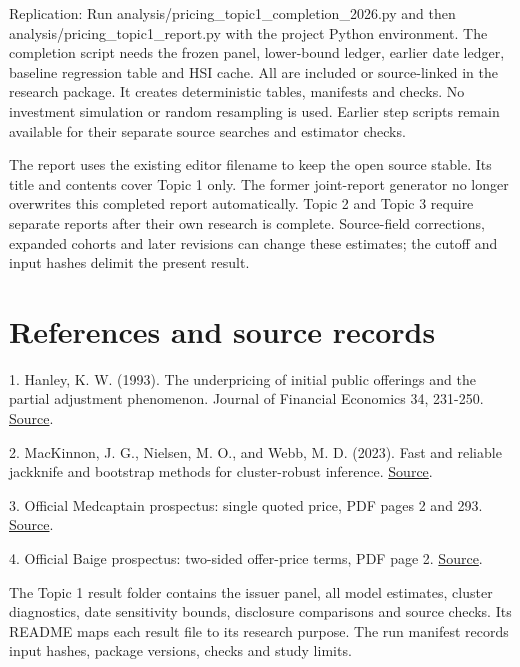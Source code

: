 \documentclass[10pt,a4paper]{article}
\begin{document}
Replication: Run analysis/pricing\_topic1\_completion\_2026.py and then analysis/pricing\_topic1\_report.py with the project Python environment. The completion script needs the frozen panel, lower-bound ledger, earlier date ledger, baseline regression table and HSI cache. All are included or source-linked in the research package. It creates deterministic tables, manifests and checks. No investment simulation or random resampling is used. Earlier step scripts remain available for their separate source searches and estimator checks.

The report uses the existing editor filename to keep the open source stable. Its title and contents cover Topic 1 only. The former joint-report generator no longer overwrites this completed report automatically. Topic 2 and Topic 3 require separate reports after their own research is complete. Source-field corrections, expanded cohorts and later revisions can change these estimates; the cutoff and input hashes delimit the present result.

\section*{References and source records}

{\footnotesize 1. Hanley, K. W. (1993). The underpricing of initial public offerings and the partial adjustment phenomenon. Journal of Financial Economics 34, 231-250. \href{https://business.lehigh.edu/sites/default/files/2019-08/7%20hanley_1993_jfe_0.pdf}{Source}.}\par

{\footnotesize 2. MacKinnon, J. G., Nielsen, M. O., and Webb, M. D. (2023). Fast and reliable jackknife and bootstrap methods for cluster-robust inference. \href{https://arxiv.org/abs/2301.04527}{Source}.}\par

{\footnotesize 3. Official Medcaptain prospectus: single quoted price, PDF pages 2 and 293. \href{https://www1.hkexnews.hk/listedco/listconews/sehk/2026/0828/2026082800009.pdf}{Source}.}\par

{\footnotesize 4. Official Baige prospectus: two-sided offer-price terms, PDF page 2. \href{https://www1.hkexnews.hk/listedco/listconews/sehk/2026/0618/2026061800045.pdf}{Source}.}\par

The Topic 1 result folder contains the issuer panel, all model estimates, cluster diagnostics, date sensitivity bounds, disclosure comparisons and source checks. Its README maps each result file to its research purpose. The run manifest records input hashes, package versions, checks and study limits.
\end{document}
